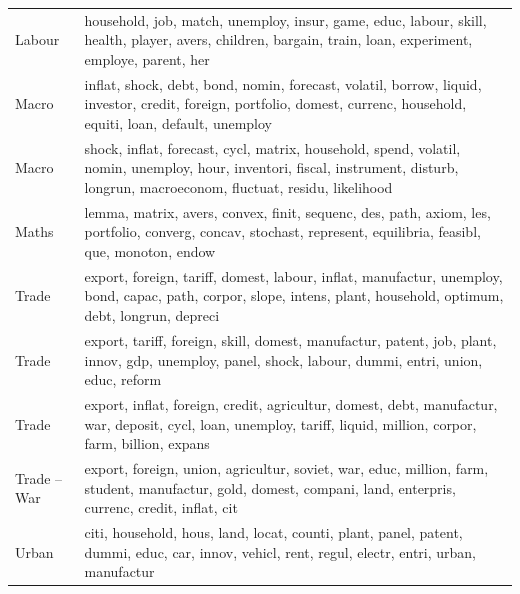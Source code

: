 \begin{table}[tb]
\begin{tabularx}{\hsize}{lY}
Labour & household, job, match, unemploy, insur, game, educ, labour, skill, health, player, avers, children, bargain, train, loan, experiment, employe, parent, her \\
Macro & inflat, shock, debt, bond, nomin, forecast, volatil, borrow, liquid, investor, credit, foreign, portfolio, domest, currenc, household, equiti, loan, default, unemploy \\
Macro & shock, inflat, forecast, cycl, matrix, household, spend, volatil, nomin, unemploy, hour, inventori, fiscal, instrument, disturb, longrun, macroeconom, fluctuat, residu, likelihood \\
Maths & lemma, matrix, avers, convex, finit, sequenc, des, path, axiom, les, portfolio, converg, concav, stochast, represent, equilibria, feasibl, que, monoton, endow \\
Trade & export, foreign, tariff, domest, labour, inflat, manufactur, unemploy, bond, capac, path, corpor, slope, intens, plant, household, optimum, debt, longrun, depreci \\
Trade & export, tariff, foreign, skill, domest, manufactur, patent, job, plant, innov, gdp, unemploy, panel, shock, labour, dummi, entri, union, educ, reform \\
Trade & export, inflat, foreign, credit, agricultur, domest, debt, manufactur, war, deposit, cycl, loan, unemploy, tariff, liquid, million, corpor, farm, billion, expans \\
Trade – War & export, foreign, union, agricultur, soviet, war, educ, million, farm, student, manufactur, gold, domest, compani, land, enterpris, currenc, credit, inflat, cit \\
Urban & citi, household, hous, land, locat, counti, plant, panel, patent, dummi, educ, car, innov, vehicl, rent, regul, electr, entri, urban, manufactur \\
\bottomrule
\end{tabularx}
\end{table}
